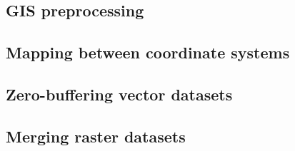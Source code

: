 \begin{appendices}
  \section{GIS preprocessing}
  \subsection{Mapping between coordinate systems}%
  \label{app:srid-change}
  
  \subsection{Zero-buffering vector datasets}%
  \label{app:zero-buffer}
  
  \subsection{Merging raster datasets}%
  \label{app:raster-merging}
  
\end{appendices}
